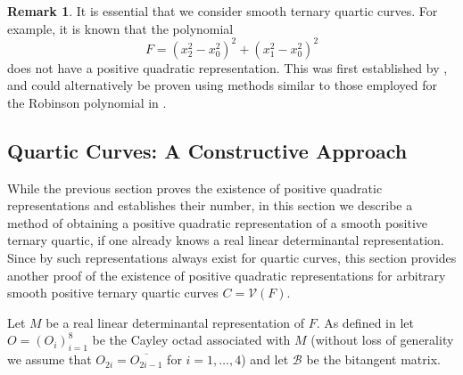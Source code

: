 \documentclass[a4paper,10pt]{amsart}
\theoremstyle{definition}
\newtheorem{rem}[Def]{Remark}
\theoremstyle{plain}
\newcommand{\cB}{{\mathcal B}}
\newcommand{\cV}{{\mathcal V}}
\begin{document}
\begin{rem}
    It is essential that we consider smooth ternary quartic curves. For example, it is known that the polynomial
    \begin{equation*}
        F = (x_2^2 - x_0^2)^2 + (x_1^2 - x_0^2)^2
    \end{equation*}
    does not have a positive quadratic representation. This was first established by \cite[\S 7]{quarez}, and could alternatively be proven using methods similar to those employed for the Robinson polynomial in .
\end{rem}


\subsection{Quartic Curves: A Constructive Approach}

While the previous section proves the existence of positive quadratic representations and establishes their number, in this section we describe a method of obtaining a positive quadratic representation of a smooth positive ternary quartic, if one already knows a real linear determinantal representation. Since by  such representations always exist for quartic curves, this section provides another proof of the existence of positive quadratic representations for arbitrary smooth positive ternary quartic curves $C = \cV(F)$.

Let $M$ be a real linear determinantal representation of $F$. As defined in  let $O = (O_i)_{i=1}^8$ be the Cayley octad associated with $M$ (without loss of generality we assume that $O_{2i} = \overline{O_{2i-1}}$ for $i = 1, \dots, 4$) and let $\cB$ be the bitangent matrix.
\end{document}
